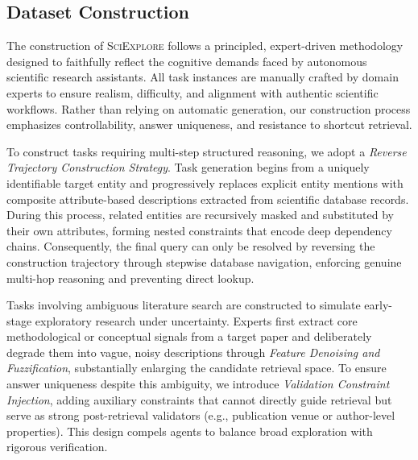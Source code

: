

\subsection{Dataset Construction}
\label{app:datasets_construction}

The construction of \textsc{SciExplore} follows a principled, expert-driven methodology designed to faithfully reflect the cognitive demands faced by autonomous scientific research assistants. All task instances are manually crafted by domain experts to ensure realism, difficulty, and alignment with authentic scientific workflows. Rather than relying on automatic generation, our construction process emphasizes controllability, answer uniqueness, and resistance to shortcut retrieval.

To construct tasks requiring multi-step structured reasoning, we adopt a \emph{Reverse Trajectory Construction Strategy}. Task generation begins from a uniquely identifiable target entity and progressively replaces explicit entity mentions with composite attribute-based descriptions extracted from scientific database records. During this process, related entities are recursively masked and substituted by their own attributes, forming nested constraints that encode deep dependency chains. Consequently, the final query can only be resolved by reversing the construction trajectory through stepwise database navigation, enforcing genuine multi-hop reasoning and preventing direct lookup.

Tasks involving ambiguous literature search are constructed to simulate early-stage exploratory research under uncertainty. Experts first extract core methodological or conceptual signals from a target paper and deliberately degrade them into vague, noisy descriptions through \emph{Feature Denoising and Fuzzification}, substantially enlarging the candidate retrieval space. To ensure answer uniqueness despite this ambiguity, we introduce \emph{Validation Constraint Injection}, adding auxiliary constraints that cannot directly guide retrieval but serve as strong post-retrieval validators (e.g., publication venue or author-level properties). This design compels agents to balance broad exploration with rigorous verification.


